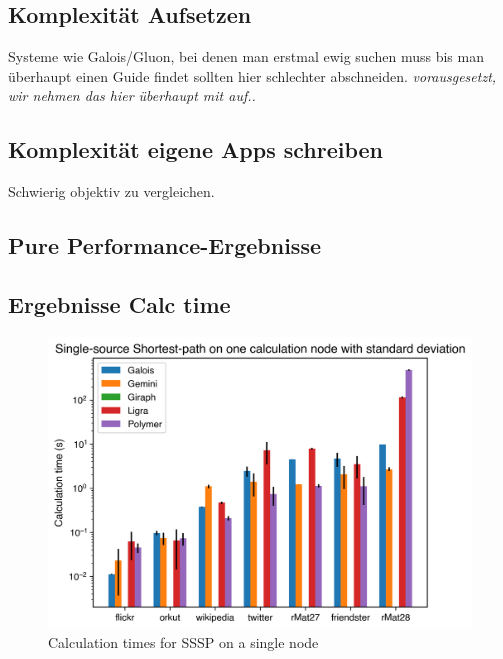 

\subsection{Komplexität Aufsetzen}
Systeme wie Galois/Gluon, bei denen man erstmal ewig suchen muss bis man überhaupt einen Guide findet sollten hier schlechter abschneiden. \emph{vorausgesetzt, wir nehmen das hier überhaupt mit auf..}

\subsection{Komplexität eigene Apps schreiben}
Schwierig objektiv zu vergleichen.


\subsection{Pure Performance-Ergebnisse}

\subsection{Ergebnisse Calc time}
\begin{figure}
	\includegraphics[width=\columnwidth]{../../plots/singleNodeSSSP_calcTime.png}
	\caption{Calculation times for SSSP on a single node}
	\label{fig:singleNodeSSSP_calc}
\end{figure}


